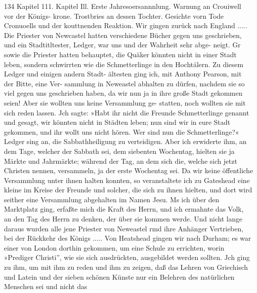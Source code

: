 134 Kapitel 111.
Kapitel Ill.
Erste Jahresoersannnlung. Warnung an Crouiwell vor der Königs-
krone. Trostbries an dessen Tochter. Gesichte vorn Tode Cronuoells
und der kouttnenden Reaktion.
Wir gingen zurück nach England ..... Die Priester
von Newcastel hatten verschiedene Bücher gegen uns geschrieben,
und ein Stadtitltester, Ledger, war uns und der Wahrheit sehr abge-
neigt. Gr sowie die Priester hatten behauptet, die Quäker könnten
nicht in einer Stadt leben, sondern schwirrten wie die Schmetterlinge
in den Hochtälern. Zu diesem Ledger und einigen andern Stadt-
ältesten ging ich, mit Anthony Pearson, mit der Bitte, eine Ver-
sammlung in Neweastel abhalten zu dürfen, nachdem sie so viel
gegen uns geschrieben haben, da wir nun ja in ihre große Stadt
gekommen seien! Aber sie wollten uns keine Versammlung ge-
statten, noch wollten sie mit sich reden lassen. Jch sagte: »Habt
ihr nicht die Freunde Schmetterlinge genannt und gesagt, wir
könnten nicht in Städten leben; nun sind wir in eure Stadt gekommen,
und ihr wollt uns nicht hören. Wer sind nun die Schmetterlinge?«
Ledger sing an, die Sabbathheiligung zu verteidigen. Aber ich
erwiderte ihm, an dem Tage, welcher der Sabbath sei, dem siebenten
Wochentag, hielten sie ja Märkte und Jahrmärkte; während der Tag,
an dem sich die, welche sich jetzt Christen nennen, versammeln, ja
der erste Wochentag sei. Da wir keine öffentliche Versammlung
unter ihnen halten konnten, so veranstaltete ich zu Gateshead
eine kleine im Kreise der Freunde und solcher, die sich zu ihnen
hielten, und dort wird seither eine Versammlung abgehalten im
Namen Jesu. Ms ich über den Marktplatz ging, erfaßte mich
die Kraft des Herrn, und ich ermahnte das Volk, an den Tag
des Herrn zu denken, der über sie kommen werde. Und nicht
lange daraus wurden alle jene Priester von Neweastel rmd ihre
Anhänger Vertrieben, bei der Rückkehr des Königs ..... Von
Heatshead gingen wir nach Durham; es war einer von London
dorthin gekommen, um eine Schule zu errichten, worin »Prediger
Christi'', wie sie sich ausdrückten, ausgebildet werden sollten. Jch
ging zu ihm, um mit ihm zu reden und ihm zu zeigen, daß das
Lehren von Griechisch und Latein und der sieben schönen Künste
nur ein Belehren des natürlichen Menschen sei und nicht das


